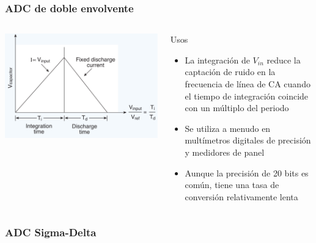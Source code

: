 \documentclass{beamer}
\begin{document}
\begin{frame}
\frametitle{ADC de doble envolvente}
\begin{columns}
\begin{column}{0.4\textwidth}
\begin{center}     
      \includegraphics[height=0.4\textheight,width=\textwidth]{d3/adc_dual_slope_curve}
\end{center}     
\end{column}
\begin{column}{0.6\textwidth}
\begin{alertblock}{Usos}
\begin{itemize}
\item La integración de $V_{in}$ reduce la captación de ruido en la frecuencia
de línea de CA cuando el tiempo de integración coincide con un múltiplo del periodo
\item {\color{blue} Se utiliza a menudo en multímetros digitales de precisión y
medidores de panel}
\item Aunque la precisión de 20 bits es común, tiene una tasa de conversión relativamente 
lenta
\end{itemize}
\end{alertblock}
\end{column}
\end{columns}
\end{frame}

\subsubsection{ADC Sigma-Delta}
\end{document}
